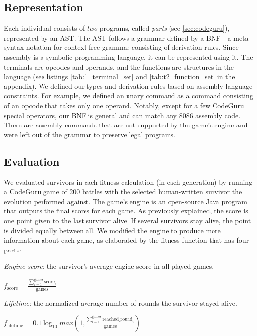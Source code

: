 \documentclass[dvipsnames, format=sigconf]{acmart}
\begin{document}
\subsection{Representation}
Each individual consists of \textit{two} programs, called \textit{parts} (see \autoref{sec:codeguru}), represented by an AST. The AST follows a grammar defined by a BNF---a meta-syntax notation for context-free grammar consisting of derivation rules. Since assembly is a symbolic programming language, it can be represented using it. The terminals are opcodes and operands, and the functions are structures in the language (see listings \ref{tab:1_terminal_set} and \ref{tab:t2_function_set} in the appendix). We defined our types and derivation rules based on assembly language constraints. For example, we defined an unary command as a command consisting of an opcode that takes only one operand. Notably, except for a few CodeGuru special operators, our BNF is general and can match any 8086 assembly code. There are assembly commands that are not supported by the game's engine and were left out of the grammar to preserve legal programs.

\subsection{Evaluation}
\label{Evaluation_method}
We evaluated survivors in each fitness calculation (in each generation) by running a CodeGuru game of 200 battles with the selected human-written survivor the evolution performed against. The game's engine is an open-source Java program that outputs the final scores for each game. As previously explained, the score is one point given to the last survivor alive. If several survivors stay alive, the point is divided equally between all. We modified the engine to produce more information about each game, as elaborated by the fitness function that has four parts:

\textit{Engine score:} the survivor's average engine score in all played games. 
\begin{center}
$f_{\text{score}} = \frac{\sum_{i=1}^{\text{games}} \text{score}_i}{\text{games}}$
\end{center}

\textit{Lifetime:} the normalized average number of rounds the survivor stayed alive.
\begin{center}
$f_{\text{lifetime}} = 0.1 \log_{10} max\left(1, \frac{\sum_{i=1}^{\text{games}} \text{reached\_round}_i}{\text{games}}\right)$
\end{center}
\end{document}
